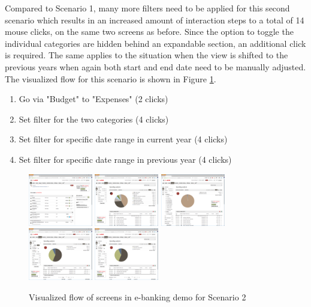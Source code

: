 Compared to Scenario 1, many more filters need to be applied for this second scenario which results in an increased amount of interaction steps to a total of 14 mouse clicks, on the same two screens as before. Since the option to toggle the individual categories are hidden behind an expandable section, an additional click is required. The same applies to the situation when the view is shifted to the previous years when again both start and end date need to be manually adjusted. The visualized flow for this scenario is shown in Figure \ref{fig:scenariotwoebanking}.
\begin{enumerate}
	\item Go via "Budget" to "Expenses" (2 clicks)
	\item Set filter for the two categories (4 clicks)
	\item Set filter for specific date range in current year (4 clicks)
	\item Set filter for specific date range in previous year (4 clicks)
\end{enumerate}
\begin{figure}[h]
	\begin{center}
		\includegraphics[width=2.8cm]{03_Figures/09_Evaluation/UBS_1_Overview.png}
		\includegraphics[width=2.8cm]{03_Figures/09_Evaluation/UBS_2_SpendingAnalysis.png}
		\includegraphics[width=2.8cm]{03_Figures/09_Evaluation/UBS_2_SpendingAnalysis_FilterCat.png}
		\includegraphics[width=2.8cm]{03_Figures/09_Evaluation/UBS_2_SpendingAnalysis_Filter.png}
		\includegraphics[width=2.8cm]{03_Figures/09_Evaluation/UBS_2_SpendingAnalysis_Filter.png}
		\caption{Visualized flow of screens in e-banking demo for Scenario 2}
		\label{fig:scenariotwoebanking}
	\end{center}
\end{figure}


